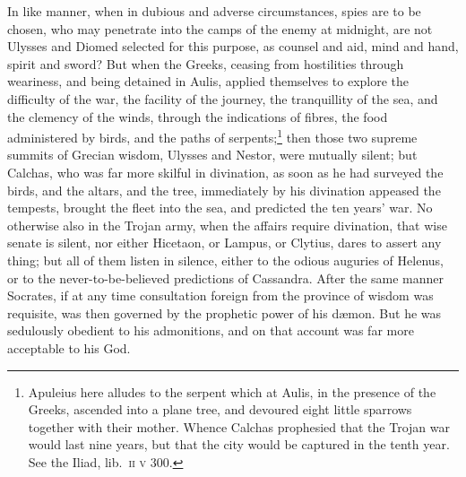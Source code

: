 \documentclass[12pt]{article}
\begin{document}
In like manner, when in dubious and adverse circumstances, spies are to be
chosen, who may penetrate into the camps of the enemy at midnight, are not
Ulysses and Diomed selected for this purpose, as counsel and aid, mind and
hand, spirit and sword? But when the Greeks, ceasing from hostilities through
weariness, and being detained in Aulis, applied themselves to explore the
difficulty of the war, the facility of the journey, the tranquillity of the
sea, and the clemency of the winds, through the indications of fibres, the food
administered by birds, and the paths of serpents;\footnote{Apuleius here
alludes to the serpent which at Aulis, in the presence of the Greeks, ascended
into a plane tree, and devoured eight little sparrows together with their
mother. Whence Calchas prophesied that the Trojan war would last nine years,
but that the city would be captured in the tenth year. See the Iliad,
lib.~\textsc{ii} \textsc{v} 300.} then those two supreme summits of Grecian
wisdom, Ulysses and Nestor, were mutually silent; but Calchas, who was far more
skilful in divination, as soon as he had surveyed the birds, and the altars,
and the tree, immediately by his divination appeased the tempests, brought the
fleet into the sea, and predicted the ten years' war. No otherwise also in the
Trojan army, when the affairs require divination, that wise senate is silent,
nor either Hicetaon, or Lampus, or Clytius, dares to assert any thing; but all
of them listen in silence, either to the odious auguries of Helenus, or to the
never-to-be-believed predictions of Cassandra. After the same manner Socrates,
if at any time consultation foreign from the province of wisdom was requisite,
was then governed by the prophetic power of his d{\ae}mon. But he was
sedulously obedient to his admonitions, and on that account was far more
acceptable to his God.
\end{document}
